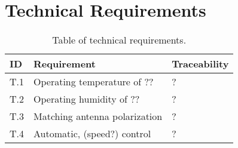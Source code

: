 \section{Technical Requirements}
\begin{table}[H]
    \centering
    \begin{tabular}{p{}|>{\raggedright}p{}|p{}}
        \textbf{ID} & \textbf{Requirement} & \textbf{Traceability} \\
        \hline
        \hline
        T.1 & Operating temperature of ?? & ? \\
        T.2 & Operating humidity of ?? & ? \\
        T.3 & Matching antenna polarization & ? \\
        T.4 & Automatic, (speed?) control & ? \\
    \end{tabular}
    \caption{Table of technical requirements.}
    \label{tab:tech_req}
\end{table}

